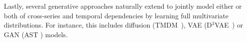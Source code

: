 \documentclass[a4paper,oneside,bibliography=totoc]{scrbook}
\begin{document}
Lastly, several generative approaches naturally extend to jointly model either or both of cross-series and temporal dependencies by learning full multivariate distributions. 
For instance, this includes diffusion (TMDM~\cite{li_transformer-modulated_2023}), VAE (D$^3$VAE~\cite{li_generative_2022}) or GAN (AST \cite{wu_adversarial_2020}) models.

\end{document}
